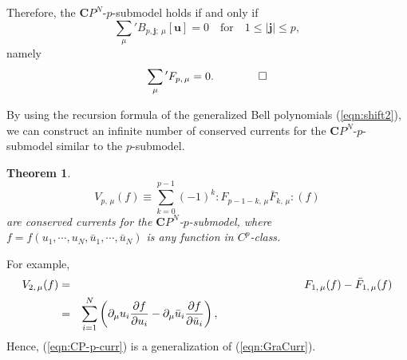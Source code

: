 \documentclass[makeidx,12pt,openany]{report}
\newtheorem{thm}[df]{Theorem}
\begin{document}
Therefore, the ${\mathbf{C}}P^N$-$p$-submodel holds if and only if 
\begin{equation}
 \sum_{\mu}{}'B_{p, \mathbf{j};\ \mu}[\mathbf{u}]=0
 \quad \mbox{for} \quad 1 \le |{\mathbf{j}}| \le p, 
\end{equation}
namely
\begin{equation}
 \sum_{\mu}{}'F_{p,\, \mu}=0. \qquad \qed
\end{equation}

By using the recursion formula of the generalized Bell polynomials
(\ref{eqn:shift2}), 
we can construct an infinite number of 
conserved currents for the ${\mathbf{C}}P^N$-$p$-submodel 
similar to the $p$-submodel. 
\begin{thm}
\begin{equation}
V_{p,\, \mu}(f) \equiv 
  \sum_{k=0}^{p-1}(-1)^k :F_{p-1-k,\, \mu}\bar{F}_{k,\, \mu}:(f)
  \label{eqn:CP-p-curr}
\end{equation}
are conserved currents for the ${\mathbf{C}}P^N$-$p$-submodel, 
where \\ $f=f(u_1,\cdots,u_N,\bar{u}_1,\cdots,\bar{u}_N)$ 
is any function in $C^p$-class. 
\end{thm}
For example, 
\begin{eqnarray}
 V_{2,\, \mu}(f) &=& F_{1,\, \mu}(f)-\bar{F}_{1,\, \mu}(f) \nonumber \\
   &=& \sum_{i=1}^N \left(
      \partial_{\mu}u_i \frac{\partial f}{\partial u_i}
      -\partial_{\mu}\bar{u}_i \frac{\partial f}{\partial \bar{u}_i}
      \right), 
      \hspace{55mm}
\end{eqnarray}
Hence, (\ref{eqn:CP-p-curr}) is a generalization of (\ref{eqn:GraCurr}). 

\end{document}
